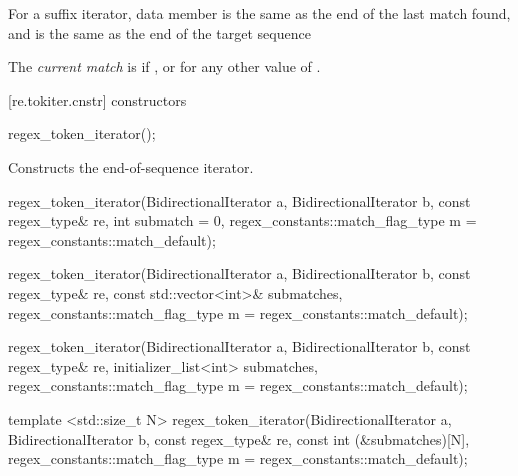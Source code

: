 \pnum
\enternote For a suffix iterator, data
member  is the same as the end of the last match
found, and  is the same as the end of the target
sequence \exitnote

\pnum
The \textit{current match} is  if , or
 for any other value of .

[re.tokiter.cnstr]{ constructors}

%
\begin{itemdecl}
regex_token_iterator(); 
\end{itemdecl}

\begin{itemdescr}
\pnum
\effects  Constructs the end-of-sequence iterator.
\end{itemdescr}

%
\begin{itemdecl}
regex_token_iterator(BidirectionalIterator a, BidirectionalIterator b, 
                    const regex_type& re, 
                    int submatch = 0, 
                    regex_constants::match_flag_type m =
                     regex_constants::match_default); 

regex_token_iterator(BidirectionalIterator a, BidirectionalIterator b, 
                    const regex_type& re, 
                    const std::vector<int>& submatches, 
                    regex_constants::match_flag_type m =
                     regex_constants::match_default); 

regex_token_iterator(BidirectionalIterator a, BidirectionalIterator b,
                    const regex_type& re, 
                    initializer_list<int> submatches,
                    regex_constants::match_flag_type m =
                      regex_constants::match_default);

template <std::size_t N>
  regex_token_iterator(BidirectionalIterator a, BidirectionalIterator b, 
                    const regex_type& re, 
                    const int (&submatches)[N],
                    regex_constants::match_flag_type m =
                     regex_constants::match_default); 
\end{itemdecl}

